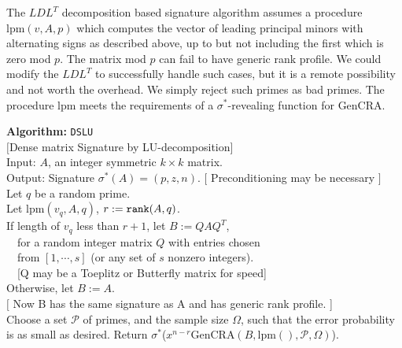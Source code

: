 \documentclass{acm_proc_article-sp}
\makeatletter
\newcommand{\rank}[1]{\ensuremath{\mbox{\tt rank}(#1)}}
\newlength{\Stmtindent}
\newenvironment{algorithm}[1]
{
   \setlength{\Stmtindent}{10pt}
   \def\Stmt{\@ifnextchar[{\@Stmt}{\@Stmt[]}}
   \def\@Stmt[##1]{\par\hspace*{\Stmtindent}\llap{##1\enspace\hfil}%
                   \hangindent\Stmtindent\ignorespaces}
   \def\Inspec{\par\hangindent0pt\noindent%
               \rlap{\@alginheader}\gdef\@alginheader{}%
               \hangindent1.0\Stmtindent\ignorespaces}
   \def\Outspec{\par\hangindent0pt\noindent%
                \rlap{\@algoutheader}\gdef\@algoutheader{}%
                \hangindent1.0\Stmtindent\ignorespaces}
   \def\Procspec{\par\hangindent0pt\noindent%
                \rlap{\@algprocheader}\gdef\@algprocheader{}%
                \hangindent1.0\Stmtindent\ignorespaces
				}
   \def\>{\advance\hangindent\Stmtindent\hspace*{\Stmtindent}\ignorespaces}
   \def\@alginheader{Input:}
   \def\@algoutheader{Output:}
   \def\@algprocheader{Method:}

   \parindent=0pt
   \parskip=1pt

   \medbreak\par {\bf Algorithm: }{\tt #1}
}
{\smallbreak}
\newcommand{\signature}{\ensuremath{\sigma^{*}}}
\newcommand{\lpm}{\ensuremath{\mbox{lpm}}}
\newcommand{\p}{\ensuremath{p}}
\newcommand{\z}{\ensuremath{z}}
\newcommand{\n}{\ensuremath{n}}
\newcommand{\rSize}{\ensuremath{\Omega}}
\newcommand{\set}{\ensuremath{\mathcal P}}
\makeatother
\begin{document}
The $LDL^T$ decomposition based signature algorithm assumes a procedure 
$\lpm(v, A, p)$ which 
computes the vector 
of leading principal minors with alternating signs as described above, 
up to but not including the first which is zero mod $p$.  
The matrix mod $p$ can fail to have generic rank profile.
We could modify the $LDL^T$ to successfully handle such cases, but it is a 
remote possibility and not worth the overhead.  
We simply reject such primes as bad primes.
The procedure $\lpm$ 
meets the requirements of a \signature-revealing function for GenCRA.  

\begin{algorithm}{DSLU}\label{siglu}\\
$[$Dense matrix Signature by LU-decomposition]\\
Input: $A$, an integer symmetric $k\times k$ matrix.\\
Output: Signature $\signature(A) = (\p, \z, \n)$.
\Stmt[1.] $[$ Preconditioning may be necessary $]$\\
Let $q$ be a random prime.\\ 
Let $\lpm(v_q, A,q)$, $r := \rank{A, q}$.\\
If length of $v_q$ less than $r + 1$, let $B := QAQ^T$,\\
$~~~$ for a random integer matrix $Q$ with entries chosen\\ 
$~~~$ from $[1, \cdots, s]$ (or any set of $s$ nonzero integers).\\
$~~~$ [Q may be a Toeplitz or Butterfly matrix for speed]\\
Otherwise, let $B := A$.\\
$[$ Now B has the same signature as A and has generic rank profile. ]\\
Choose a set $\set$ of primes, and the sample size $\rSize$, such that
the error probability is as small as desired.
\Stmt[2.] %
Return \signature($x^{n-r}$GenCRA$(B, \lpm(), \set, \rSize)$).
\end{algorithm}
\end{document}
